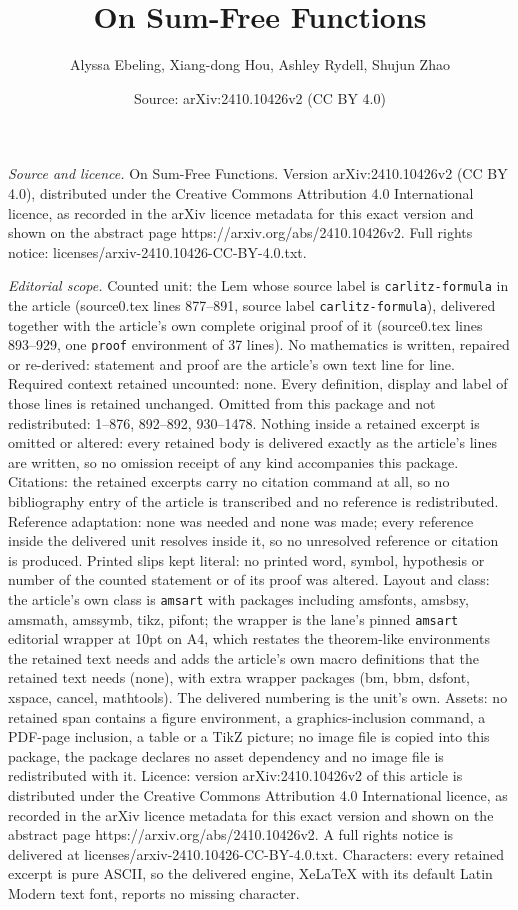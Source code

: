 \documentclass[10pt,a4paper]{amsart}
\title[On Sum-Free Functions]{On Sum-Free Functions}
\author{Alyssa Ebeling, Xiang-dong Hou, Ashley Rydell, Shujun Zhao}
\date{Source: arXiv:2410.10426v2 (CC BY 4.0)}
\begin{document}
\maketitle

\noindent\emph{Source and licence.} On Sum-Free Functions. Version arXiv:2410.10426v2 (CC BY 4.0), distributed under the Creative Commons Attribution 4.0 International licence, as recorded in the arXiv licence metadata for this exact version and shown on the abstract page https://arxiv.org/abs/2410.10426v2. Full rights notice: licenses/arxiv-2410.10426-CC-BY-4.0.txt.\par\smallskip

\noindent\textit{Editorial scope.} Counted unit: the Lem whose source label is \texttt{carlitz-formula} in the article (source0.tex lines 877--891, source label \texttt{carlitz-formula}), delivered together with the article's own complete original proof of it (source0.tex lines 893--929, one \texttt{proof} environment of 37 lines). No mathematics is written, repaired or re-derived: statement and proof are the article's own text line for line. Required context retained uncounted: none. Every definition, display and label of those lines is retained unchanged. Omitted from this package and not redistributed: 1--876, 892--892, 930--1478. Nothing inside a retained excerpt is omitted or altered: every retained body is delivered exactly as the article's lines are written, so no omission receipt of any kind accompanies this package. Citations: the retained excerpts carry no citation command at all, so no bibliography entry of the article is transcribed and no reference is redistributed. Reference adaptation: none was needed and none was made; every reference inside the delivered unit resolves inside it, so no unresolved reference or citation is produced. Printed slips kept literal: no printed word, symbol, hypothesis or number of the counted statement or of its proof was altered. Layout and class: the article's own class is \texttt{amsart} with packages including amsfonts, amsbsy, amsmath, amssymb, tikz, pifont; the wrapper is the lane's pinned \texttt{amsart} editorial wrapper at 10pt on A4, which restates the theorem-like environments the retained text needs and adds the article's own macro definitions that the retained text needs (none), with extra wrapper packages (bm, bbm, dsfont, xspace, cancel, mathtools). The delivered numbering is the unit's own. Assets: no retained span contains a figure environment, a graphics-inclusion command, a PDF-page inclusion, a table or a TikZ picture; no image file is copied into this package, the package declares no asset dependency and no image file is redistributed with it. Licence: version arXiv:2410.10426v2 of this article is distributed under the Creative Commons Attribution 4.0 International licence, as recorded in the arXiv licence metadata for this exact version and shown on the abstract page https://arxiv.org/abs/2410.10426v2. A full rights notice is delivered at licenses/arxiv-2410.10426-CC-BY-4.0.txt. Characters: every retained excerpt is pure ASCII, so the delivered engine, XeLaTeX with its default Latin Modern text font, reports no missing character.
\end{document}
